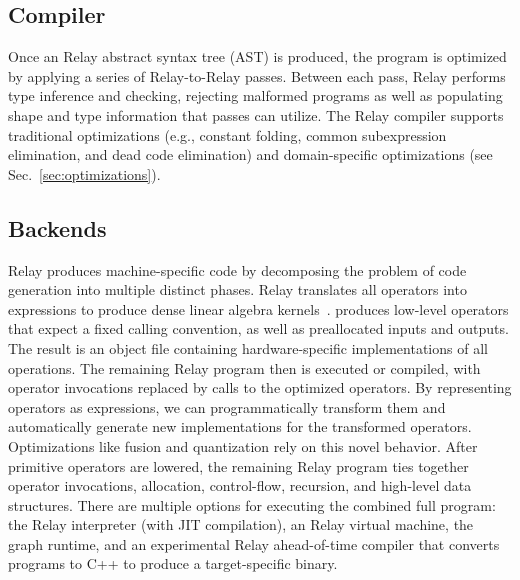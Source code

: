   \subsection*{Compiler}
  Once an Relay abstract syntax tree (AST) is produced,
    the program is optimized by applying a series of Relay-to-Relay
    passes.
  Between each pass, Relay performs type inference and checking,
    rejecting malformed programs as well as populating shape and type
    information that passes can utilize.
  The Relay compiler supports traditional optimizations
    (e.g., constant folding, common subexpression elimination, and dead code elimination)
    and domain-specific optimizations
    (see Sec.~\ref{sec:optimizations}).

  \subsection*{Backends}

  Relay produces machine-specific code
    by decomposing the problem of code generation into multiple distinct phases.
  Relay translates all operators into \tvm expressions
    to produce dense linear algebra kernels~\citep{tvm_osdi18, tensor_comprehensions, halide}.
  \tvm produces low-level operators that expect a fixed calling convention,
    as well as preallocated inputs and outputs.
  The result is an object file containing hardware-specific implementations of all
    operations.
  The remaining Relay program then is executed or compiled,
    with operator invocations replaced by calls to the optimized operators.
  By representing operators as \tvm expressions, we can programmatically
    transform them and automatically generate new implementations for the transformed operators.
  Optimizations like fusion and quantization
    rely on this novel behavior.
  After primitive operators are lowered,
    the remaining Relay program ties
    together operator invocations, allocation, control-flow,
    recursion, and high-level data structures.
  There are multiple options for executing the combined full program:
    the Relay interpreter (with JIT compilation),
    an Relay virtual machine,
    the \tvm graph runtime,
    and an experimental Relay ahead-of-time compiler
    that converts programs to C++ to produce a target-specific binary.

